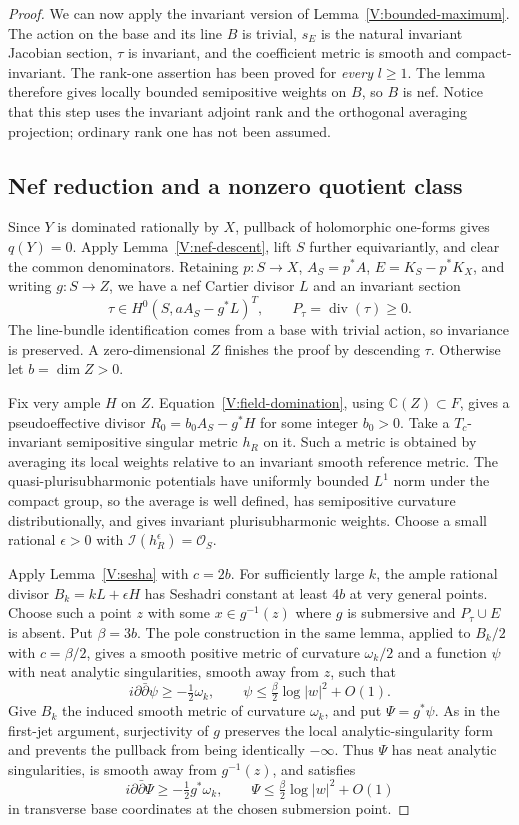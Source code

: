 \begin{proof}
We can now apply the invariant version of
Lemma~\ref{V:bounded-maximum}.  The action on the base and its line
$B$ is trivial, $s_E$ is the natural invariant Jacobian section,
$\tau$ is invariant, and the coefficient metric is smooth and
compact-invariant.  The rank-one assertion has been proved for
\emph{every} $l\ge1$.  The lemma therefore gives locally bounded
semipositive weights on $B$, so $B$ is nef.  Notice that this step
uses the invariant adjoint rank and the orthogonal averaging
projection; ordinary rank one has not been assumed.

\subsection*{Nef reduction and a nonzero quotient class}

Since $Y$ is dominated rationally by $X$, pullback of holomorphic
one-forms gives $q(Y)=0$.  Apply Lemma~\ref{V:nef-descent}, lift $S$
further equivariantly, and clear the common denominators.  Retaining
$p:S\to X$, $A_S=p^*A$, $E=K_S-p^*K_X$, and writing $g:S\to Z$,
we have a nef Cartier divisor $L$ and an invariant section
\[
 \tau\in H^0(S,aA_S-g^*L)^T,
 \qquad P_\tau=\operatorname{div}(\tau)\ge0.
\]
The line-bundle identification comes from a base with trivial action,
so invariance is preserved.  A zero-dimensional $Z$ finishes the
proof by descending $\tau$.  Otherwise let $b=\dim Z>0$.

Fix very ample $H$ on $Z$.  Equation~\eqref{V:field-domination},
using $\mathbb C(Z)\subset F$, gives a pseudoeffective divisor
$R_0=b_0A_S-g^*H$ for some integer $b_0>0$.
Take a $T_c$-invariant semipositive singular metric $h_R$ on it.
Such a metric is obtained by averaging its local weights relative
to an invariant smooth reference metric.  The quasi-plurisubharmonic
potentials have uniformly bounded $L^1$ norm under the compact group,
so the average is well defined, has semipositive curvature
distributionally, and gives invariant plurisubharmonic weights.
Choose a small rational $\epsilon>0$ with
$\mathcal I(h_R^\epsilon)=\mathcal O_S$.

Apply Lemma~\ref{V:sesha} with $c=2b$.  For sufficiently large $k$,
the ample rational divisor $B_k=kL+\epsilon H$ has Seshadri constant
at least $4b$ at very general points.  Choose such a point $z$ with
some $x\in g^{-1}(z)$ where $g$ is submersive and $P_\tau\cup E$
is absent.  Put $\beta=3b$.  The pole construction in the same lemma,
applied to $B_k/2$ with $c=\beta/2$, gives a smooth positive metric
of curvature $\omega_k/2$ and a function $\psi$ with neat analytic
singularities, smooth away from $z$, such that
\[
 i\partial\bar\partial\psi\ge-\tfrac12\omega_k,
 \qquad \psi\le\tfrac{\beta}{2}\log|w|^2+O(1).
\]
Give $B_k$ the induced smooth metric of curvature $\omega_k$, and
put $\Psi=g^*\psi$.  As in the first-jet argument, surjectivity of
$g$ preserves the local analytic-singularity form and prevents the
pullback from being identically $-\infty$.  Thus $\Psi$ has neat
analytic singularities, is smooth away from $g^{-1}(z)$, and satisfies
\[
 i\partial\bar\partial\Psi\ge-\tfrac12 g^*\omega_k,
 \qquad
 \Psi\le\tfrac{\beta}{2}\log|w|^2+O(1)
\]
in transverse base coordinates at the chosen submersion point.


\end{proof}

